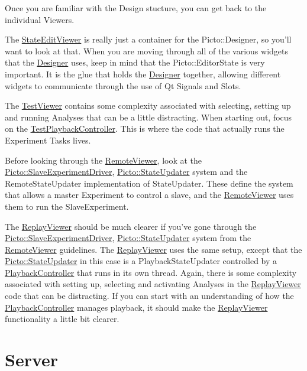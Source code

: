 Once you are familiar with the Design stucture, you can get back to the individual Viewers.
\begin{DoxyItemize}
\item The \hyperlink{class_state_edit_viewer}{State\-Edit\-Viewer} is really just a container for the Picto\-::\-Designer, so you'll want to look at that. When you are moving through all of the various widgets that the \hyperlink{class_designer}{Designer} uses, keep in mind that the Picto\-::\-Editor\-State is very important. It is the glue that holds the \hyperlink{class_designer}{Designer} together, allowing different widgets to communicate through the use of Qt Signals and Slots.
\item The \hyperlink{class_test_viewer}{Test\-Viewer} contains some complexity associated with selecting, setting up and running Analyses that can be a little distracting. When starting out, focus on the \hyperlink{class_test_playback_controller}{Test\-Playback\-Controller}. This is where the code that actually runs the Experiment Tasks lives.
\item Before looking through the \hyperlink{class_remote_viewer}{Remote\-Viewer}, look at the \hyperlink{class_picto_1_1_slave_experiment_driver}{Picto\-::\-Slave\-Experiment\-Driver}, \hyperlink{class_picto_1_1_state_updater}{Picto\-::\-State\-Updater} system and the Remote\-State\-Updater implementation of State\-Updater. These define the system that allows a master Experiment to control a slave, and the \hyperlink{class_remote_viewer}{Remote\-Viewer} uses them to run the Slave\-Experiment.
\item The \hyperlink{class_replay_viewer}{Replay\-Viewer} should be much clearer if you've gone through the \hyperlink{class_picto_1_1_slave_experiment_driver}{Picto\-::\-Slave\-Experiment\-Driver}, \hyperlink{class_picto_1_1_state_updater}{Picto\-::\-State\-Updater} system from the \hyperlink{class_remote_viewer}{Remote\-Viewer} guidelines. The \hyperlink{class_replay_viewer}{Replay\-Viewer} uses the same setup, except that the \hyperlink{class_picto_1_1_state_updater}{Picto\-::\-State\-Updater} in this case is a Playback\-State\-Updater controlled by a \hyperlink{class_playback_controller}{Playback\-Controller} that runs in its own thread. Again, there is some complexity associated with setting up, selecting and activating Analyses in the \hyperlink{class_replay_viewer}{Replay\-Viewer} code that can be distracting. If you can start with an understanding of how the \hyperlink{class_playback_controller}{Playback\-Controller} manages playback, it should make the \hyperlink{class_replay_viewer}{Replay\-Viewer} functionality a little bit clearer.
\end{DoxyItemize}\hypertarget{first_code_look_first_look_Server}{}\section{Server}\label{first_code_look_first_look_Server}
